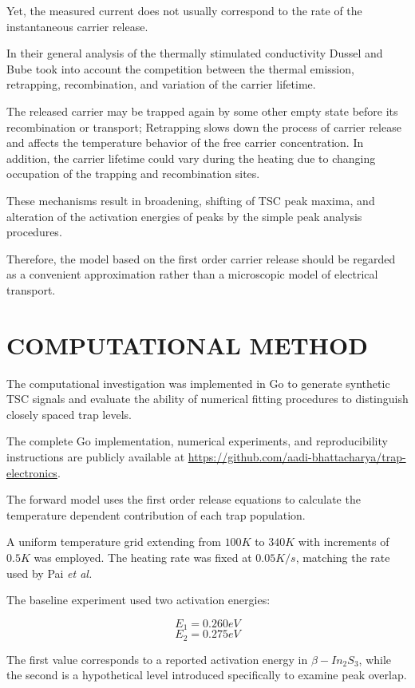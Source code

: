 \documentclass[letterpaper, 10pt, conference]{ieeeconf}
\begin{document}
Yet, the measured current does not usually correspond to the rate of the instantaneous carrier release.

In their general analysis of the thermally stimulated conductivity Dussel and Bube \cite{dussel} took into account the competition between the thermal emission, retrapping, recombination, and variation of the carrier lifetime.

The released carrier may be trapped again by some other empty state before its recombination or transport; Retrapping slows down the process of carrier release and affects the temperature behavior of the free carrier concentration. In addition, the carrier lifetime could vary during the heating due to changing occupation of the trapping and recombination sites.

These mechanisms result in broadening, shifting of TSC peak maxima, and alteration of the activation energies of peaks by the simple peak analysis procedures.

Therefore, the model based on the first order carrier release should be regarded as a convenient approximation rather than a microscopic model of electrical transport.

\section{COMPUTATIONAL METHOD}

The computational investigation was implemented in Go to generate synthetic TSC signals and evaluate the ability of numerical fitting procedures to distinguish closely spaced trap levels.

The complete Go implementation, numerical experiments, and reproducibility instructions are publicly available at \url{https://github.com/aadi-bhattacharya/trap-electronics}.

The forward model uses the first order release equations to calculate the temperature dependent contribution of each trap population.

A uniform temperature grid extending from $100 K$ to $340 K$ with increments of $0.5 K$ was employed. The heating rate was fixed at $0.05 K/s$, matching the rate used by Pai \emph{et al.}\cite{pai}

The baseline experiment used two activation energies:

$$ E_1 = 0.260 eV $$
$$ E_2 = 0.275 eV $$

The first value corresponds to a reported activation energy in $\beta-In_2S_3$, while the second is a hypothetical level introduced specifically to examine peak overlap.
\end{document}
